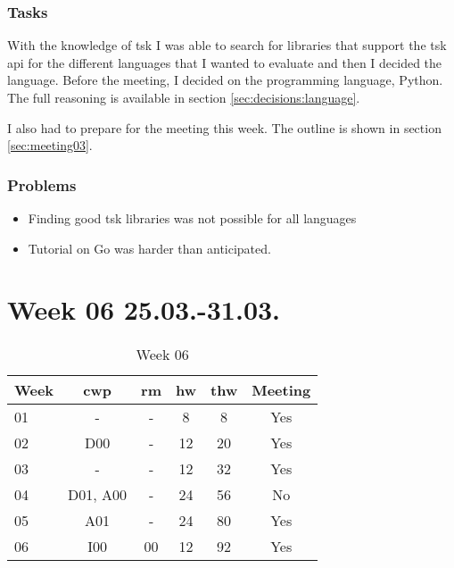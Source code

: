 \subsubsection{Tasks}

With the knowledge of \gls{tsk} I was able to search for libraries that support the \gls{tsk} \gls{api} for the different languages that I wanted to evaluate and then I decided the language. Before the meeting, I decided on the programming language, Python. The full reasoning is available in section \ref{sec:decisions:language}.

I also had to prepare for the meeting this week. The outline is shown in section \ref{sec:meeting03}.

\subsubsection{Problems}

\begin{itemize}
    \item Finding good \gls{tsk} libraries was not possible for all languages
    \item Tutorial on Go was harder than anticipated.
\end{itemize}

\section{Week 06 25.03.-31.03.}
\label{sec:journal:week06}

\begin{table}[!ht]
    \begin{center}
        \caption{Week 06}
        \label{tab:journal:week06}
        \begin{tabular}{l|c|c|c|c|c}
            \textbf{Week} & \textbf{\gls{cwp}} & \textbf{\gls{rm}} & \textbf{\gls{hw}} & \textbf{\gls{thw}} & \textbf{Meeting}\\
        \hline
        01 & - & - & 8 & 8 & Yes \\
        02 & D00 & - & 12 & 20 & Yes \\
        03 & - & - & 12 & 32 & Yes \\
        04 & D01, A00 & - & 24 & 56 & No \\
        05 & A01 & - & 24 & 80 & Yes \\
        06 & I00 & 00 & 12 & 92 & Yes \\
        \end{tabular}
    \end{center}
\end{table}


